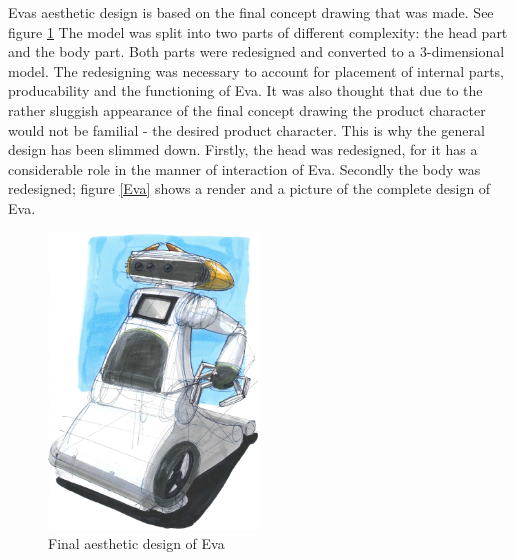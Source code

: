 \documentclass[technical_document.tex]{subfiles}
\begin{document}
Eva\textquotesingle s aesthetic design is based on the final concept drawing that was made. See figure \ref{fig:final_design}  The model was split into two parts of different complexity: the head part and the body part. Both parts were redesigned and converted to a 3-dimensional model. The redesigning was necessary to account for placement of internal parts, producability and the functioning of Eva. It was also thought that due to the rather sluggish  appearance of the final concept drawing the product character would not be familial - the desired product character. This is why the general design has been slimmed down. Firstly, the head was redesigned, for it has a considerable role in the manner of interaction of Eva. Secondly the body was redesigned; figure \ref{Eva} shows a render and a picture of the complete design of Eva.

\begin{figure}[h]
	\centering
	\mbox{\includegraphics[width=0.5\textwidth]{Images/Final_Design.png}}
	\caption{Final aesthetic design of Eva}
	\label{fig:final_design}
\end{figure}
\end{document}
